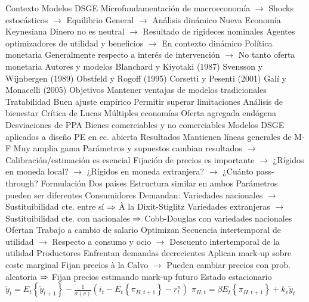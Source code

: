 \documentclass{nuevotema}
\begin{document}
\begin{esquemal}
			\3 Contexto
				\4 Modelos DSGE
				\4[] Microfundamentación de macroeconomía
				\4[] $\to$ Shocks estocásticos
				\4[] $\to$ Equilibrio General
				\4[] $\to$ Análisis dinámico
				\4 Nueva Economía Keynesiana
				\4[] Dinero no es neutral
				\4[] $\to$ Resultado de rigideces nominales
				\4[] Agentes optimizadores de utilidad y beneficios
				\4[] $\to$ En contexto dinámico
				\4 Política monetaria
				\4[] Generalmente respecto a interés de intervención
				\4[] $\to$ No tanto oferta monetaria
				\4 Autores y modelos
				\4[] Blanchard y Kiyotaki (1987)
				\4[] Svensson y Wijnbergen (1989)
				\4[] Obstfeld y Rogoff (1995)
				\4[] Corsetti y Pesenti (2001)
				\4[] Galí y Monacelli (2005)
			\3 Objetivos
				\4 Mantener ventajas de modelos tradicionales
				\4[] Tratabilidad
				\4[] Buen ajuste empírico
				\4 Permitir superar limitaciones
				\4[] Análisis de bienestar
				\4[] Crítica de Lucas
				\4[] Múltiples economías
				\4[] Oferta agregada endógena
				\4[] Desviaciones de PPA
				\4[] Bienes comerciables y no comerciables
				\4[$\then$] Modelos DSGE aplicados a diseño PE en ec. abierta
			\3 Resultados
				\4 Mantienen líneas generales de M-F
				\4 Muy amplia gama
				\4[] Parámetros y supuestos cambian resultados
				\4[] $\to$ Calibración/estimación es esencial
				\4 Fijación de precios es importante
				\4[] $\to$ ¿Rígidos en moneda local?
				\4[] $\to$ ¿Rígidos en moneda extranjera?
				\4[] $\to$ ¿Cuánto pass-through?
		\2 Formulación
			\3 Dos países
				\4 Estructura similar en ambos
				\4 Parámetros pueden ser diferentes
			\3 Consumidores
				\4 Demandan:
				\4[] Variedades nacionales
				\4[] $\to$ Sustituibilidad cte. entre sí
				\4[] $\then$ À la Dixit-Stiglitz
				\4[] Variedades extranjeras
				\4[] $\to$ Sustituibilidad cte. con nacionales
				\4[] $\then$ Cobb-Douglas con variedades nacionales
				\4 Ofertan
				\4[] Trabajo a cambio de salario
				\4 Optimizan
				\4[] Secuencia intertemporal de utilidad
				\4[] $\to$ Respecto a consumo y ocio
				\4[] $\to$ Descuento intertemporal de la utilidad
			\3 Productores
				\4 Enfrentan demandas decrecientes
				\4 Aplican mark-up sobre coste marginal
				\4 Fijan precios à la Calvo
				\4[] $\to$ Pueden cambiar precios con prob. aleatoria
				\4[] $\then$ Fijan precios estimando mark-up futuro
			\3 Estado estacionario
				\4[IS] $\tilde{y}_t = E_t \left\lbrace \tilde{y}_{t+1} \right\rbrace - \frac{1}{\sigma(v)} \left( i_t - E_t \left\lbrace \pi_{H,t+1} \right\rbrace - r_t^n \right)$
				\4[NKPC] $\pi_{H,t} = \beta E_t \left\lbrace \pi_{H,t+1} \right\rbrace + k_v \tilde{y}_t$

\end{esquemal}
\end{document}
